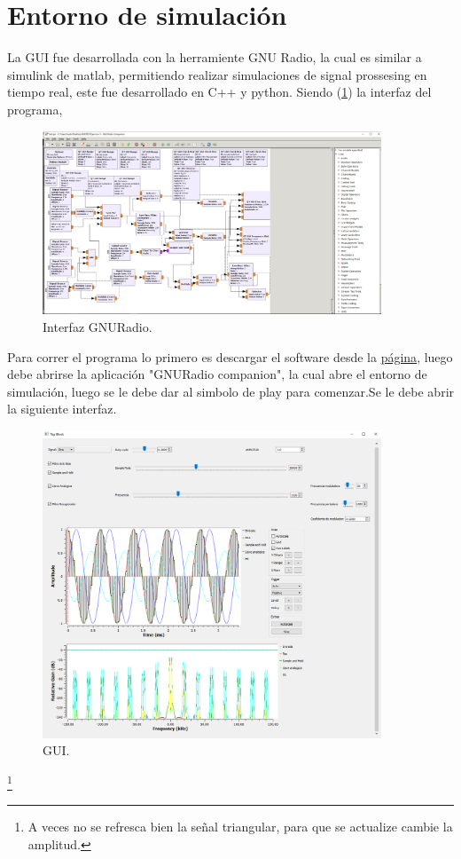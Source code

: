 


\section{Entorno de simulación}
La GUI fue desarrollada con la herramiente GNU Radio, la cual es similar a simulink de matlab, permitiendo realizar simulaciones de signal prossesing en tiempo real, este fue desarrollado en C++ y python.
Siendo (\ref{fig:gnu}) la interfaz del programa,
 \begin{figure}[H]
	\centering
	\includegraphics[width=0.9\textwidth]{ImagenesEjercicio5/gnuradio.PNG}
\caption{Interfaz GNURadio.}
	\label{fig:gnu}
\end{figure}
Para correr el programa lo primero es descargar el software desde la \href{http://www.gcndevelopment.com/gnuradio/downloads.htm}{página}, luego debe abrirse la aplicación "GNURadio companion", la cual abre el entorno de simulación, luego se le debe dar al simbolo de play para comenzar.Se le debe abrir la siguiente interfaz.
 \begin{figure}[H]
	\centering
	\includegraphics[width=0.9\textwidth]{ImagenesEjercicio5/gui.PNG}
\caption{GUI.}
	\label{fig:GUI}
\end{figure}
\footnote{A veces no se refresca bien la señal triangular, para que se actualize cambie la amplitud.}
